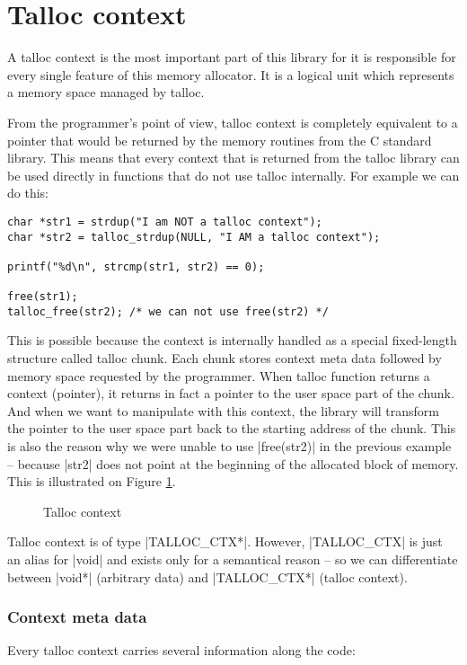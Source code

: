 \section{Talloc context}
\label{talloc:sec:context}

A talloc context is the most important part of this library for it is
responsible for every single feature of this memory allocator. It is a logical
unit which represents a memory space managed by talloc.

From the programmer's point of view, talloc context is completely equivalent to
a pointer that would be returned by the memory routines from the C standard
library. This means that every context that is returned from the talloc library
can be used directly in functions that do not use talloc internally. For
example we can do this:

\begin{lstlisting}
char *str1 = strdup("I am NOT a talloc context");
char *str2 = talloc_strdup(NULL, "I AM a talloc context");

printf("%d\n", strcmp(str1, str2) == 0);

free(str1);
talloc_free(str2); /* we can not use free(str2) */
\end{lstlisting}

This is possible because the context is internally handled as a special
fixed-length structure called talloc chunk. Each chunk stores context meta data
followed by memory space requested by the programmer. When talloc function
returns a context (pointer), it returns in fact a pointer to the user space
part of the chunk. And when we want to manipulate with this context, the
library will transform the pointer to the user space part back to the starting
address of the chunk. This is also the reason why we were unable to use
|free(str2)| in the previous example -- because |str2| does not point at the
beginning of the allocated block of memory. This is illustrated on Figure
\ref{fig:talloc-context}.

\begin{figure}[H]
  \centering
  
  \caption{Talloc context}
  \label{fig:talloc-context}
\end{figure}

Talloc context is of type |TALLOC_CTX*|. However, |TALLOC_CTX| is just an alias
for |void| and exists only for a semantical reason -- so we can differentiate
between |void*| (arbitrary data) and |TALLOC_CTX*| (talloc context).

\subsubsection{Context meta data}
Every talloc context carries several information along the code:


